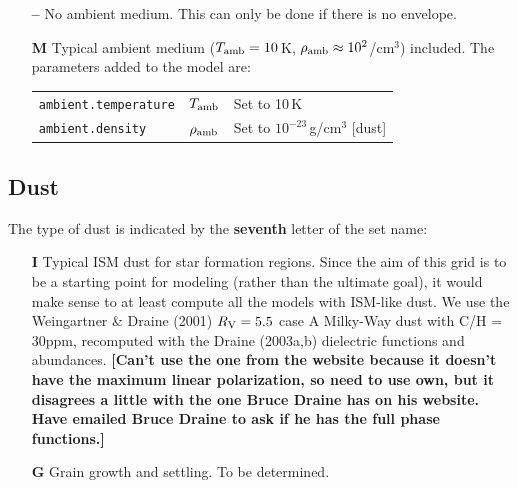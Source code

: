 \documentclass[10pt]{article}
\begin{document}
\begin{itemize}

\item[\textbf{--}] No ambient medium. This can only be done if there is no envelope.

\item[\textbf{M}] Typical ambient medium ($T_{\rm amb}=10$\,K, $\rho_{\rm amb}\approx10^2$/cm$^3$) included. The parameters added to the model are:

\begin{center}
  \begin{tabular}{llp{4in}}
    \texttt{ambient.temperature} & $T_{\rm amb}$ & Set to 10\,K \\
    \texttt{ambient.density} & $\rho_{\rm amb}$ & Set to $10^{-23}$\,g/cm$^3$ [dust] \\
  \end{tabular}
\end{center}

\end{itemize}

\subsection{Dust}

The type of dust is indicated by the \textbf{seventh} letter of the set name:

\begin{itemize}

\item[\textbf{I}] Typical ISM dust for star formation regions. Since the aim of this grid is to be a starting point for modeling (rather than the ultimate goal), it would make sense to at least compute all the models with ISM-like dust. We use the Weingartner \& Draine (2001) $R_{\rm V}=5.5$ case A Milky-Way dust with C/H = 30ppm, recomputed with the Draine (2003a,b) dielectric functions and abundances. \textbf{[Can't use the one from the website because it doesn't have the maximum linear polarization, so need to use own, but it disagrees a little with the one Bruce Draine has on his website. Have emailed Bruce Draine to ask if he has the full phase functions.]}

\item[\textbf{G}] Grain growth and settling. To be determined.



\end{itemize}
\end{document}
